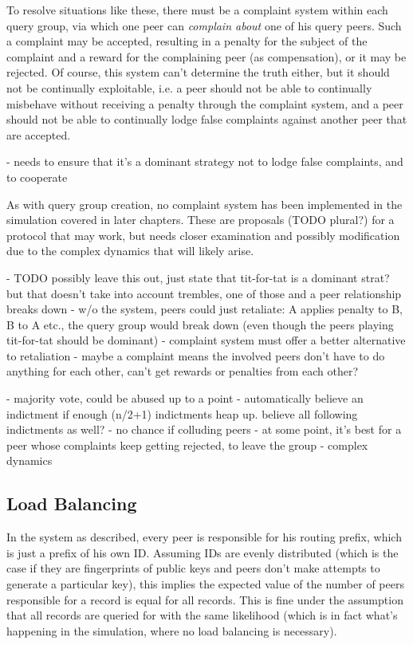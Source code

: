 To resolve situations like these, there must be a complaint system within each
query group, via which one peer can \emph{complain about} one of his query
peers. Such a complaint may be accepted, resulting in a penalty for the subject
of the complaint and a reward for the complaining peer (as compensation), or it
may be rejected. Of course, this system can't determine the truth either, but it
should not be continually exploitable, i.e. a peer should not be able to
continually misbehave without receiving a penalty through the complaint system,
and a peer should not be able to continually lodge false complaints against
another peer that are accepted.

- needs to ensure that it's a dominant strategy not to lodge false complaints,
  and to cooperate

As with query group creation, no complaint system has been implemented in the
simulation covered in later chapters. These are proposals (TODO plural?) for a
protocol that may work, but needs closer examination and possibly modification
due to the complex dynamics that will likely arise.

- TODO possibly leave this out, just state that tit-for-tat is a dominant strat?
  but that doesn't take into account trembles, one of those and a peer
  relationship breaks down
- w/o the system, peers could just retaliate: A applies penalty to B, B to A
  etc., the query group would break down (even though the peers playing
  tit-for-tat should be dominant)
- complaint system must offer a better alternative to retaliation
- maybe a complaint means the involved peers don't have to do anything for each
  other, can't get rewards or penalties from each other?

- majority vote, could be abused up to a point
- automatically believe an indictment if enough (n/2+1) indictments heap up.
  believe all following indictments as well?
- no chance if colluding peers
- at some point, it's best for a peer whose complaints keep getting rejected, to
  leave the group
- complex dynamics

\subsection{Load Balancing}
\label{sec:desc_load_balancing}
In the system as described, every peer is responsible for his routing prefix,
which is just a prefix of his own ID. Assuming IDs are evenly distributed (which
is the case if they are fingerprints of public keys and peers don't make
attempts to generate a particular key), this implies the expected value of the
number of peers responsible for a record is equal for all records. This is fine
under the assumption that all records are queried for with the same likelihood
(which is in fact what's happening in the simulation, where no load balancing is
necessary).

